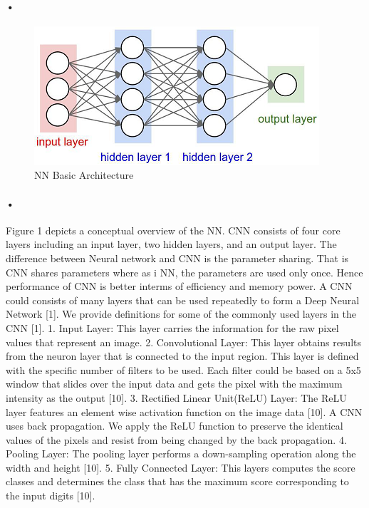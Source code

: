 \documentclass{article}
\begin{document}
\paragraph{•}
\begin{figure}
  \includegraphics[width=\linewidth]{CNNbasicarch.png}
  \caption{NN Basic Architecture}
  \label{fig:NN Basic}
\end{figure}

\paragraph{•}
Figure 1 depicts a conceptual overview of the NN. CNN consists of four core layers including an input layer, two hidden layers, and an output layer. The difference between Neural network and CNN is the parameter sharing. That is CNN shares parameters where as i NN, the parameters are used only once. Hence performance of CNN is better interms of efficiency and memory power. A CNN could consists of many layers that can be used repeatedly to form a Deep Neural Network [1]. We provide definitions for some of the commonly used layers in the CNN [1].  
1. Input Layer: This layer carries the information for the raw pixel values that represent an image. 
2. Convolutional Layer: This layer obtains results from the neuron layer that is connected to the input region. This layer is defined with the specific number of filters to be used. Each filter could be based on a 5x5 window that slides over the input data and gets the pixel with the maximum intensity as the output [10]. 
3. Rectified Linear Unit(ReLU) Layer: The ReLU layer features an element wise activation function on the image data [10]. A CNN uses back propagation. We apply the ReLU function to preserve the identical values of the pixels and resist from being changed by the back propagation. 
4. Pooling Layer: The pooling layer performs a down-sampling operation along the width and height [10]. 
5. Fully Connected Layer: This layers computes the score classes and determines the class that has the maximum score corresponding to the input digits [10]. 
 
\end{document}
